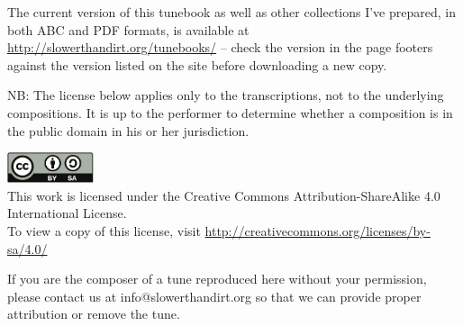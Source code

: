 \begin{titlepage}
\begin{center}
\begin{minipage}{6in}
The current version of this tunebook as well as other collections I've
prepared, in both ABC and PDF formats, is available at 
\url{http://slowerthandirt.org/tunebooks/} -- check the version in the page
footers against the version listed on the site before downloading a new
copy.

NB: The license below applies only to the transcriptions, not to the
underlying compositions. It is up to the performer to determine
whether a composition is in the public domain in his or her
jurisdiction.

\end{minipage}

\vfill


\includegraphics[width=1in]{../includes/cc-by-sa}\\
This work is licensed under the Creative Commons
Attribution-ShareAlike 4.0 International License.\\
To view a copy of this license, visit 
\url{http://creativecommons.org/licenses/by-sa/4.0/}
\end{center}
\end{titlepage}

\clearpage



\vfill

\noindent
If you are the composer of a tune reproduced here without your permission,
please contact us at info@slowerthandirt.org so that we can provide proper
attribution or remove the tune.

\cleardoublepage
